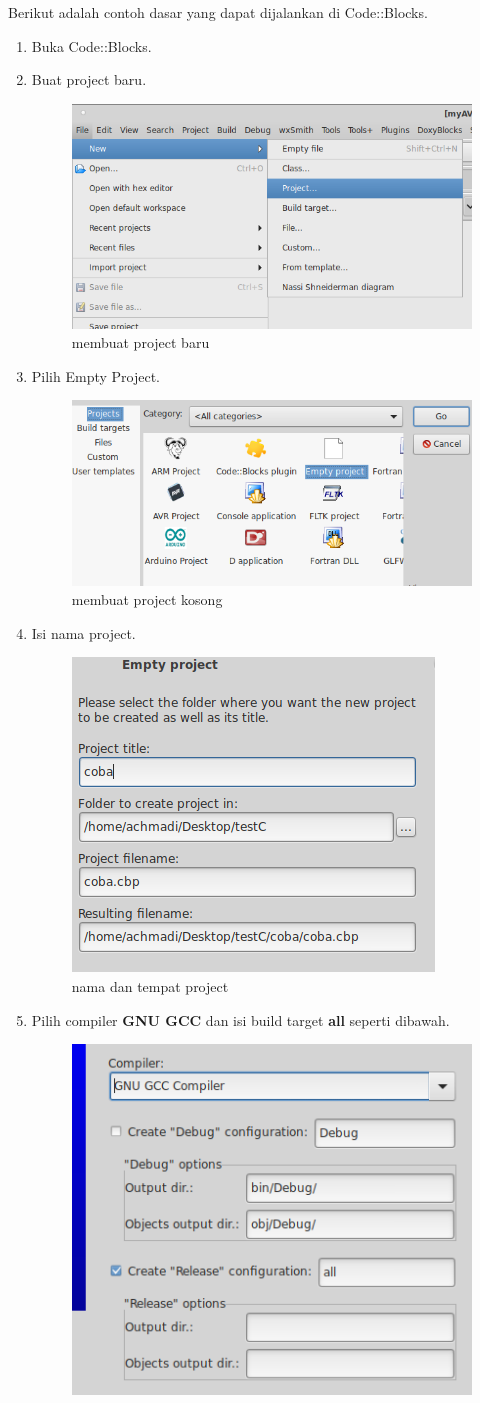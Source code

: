 \documentclass[12pt,]{article}
\begin{document}
	Berikut adalah contoh dasar yang dapat dijalankan di Code::Blocks.
	\begin{enumerate}
		\item Buka Code::Blocks.
		\item Buat project baru.
		\begin{figure}[H]
			\centering
			\includegraphics[width=0.5\linewidth]{images/c_cb_0}
			\caption{membuat project baru}
		\end{figure}
		\item Pilih Empty Project.
		\begin{figure}[H]
			\centering
			\includegraphics[width=0.4\linewidth]{images/c_cb_1}
			\caption{membuat project kosong}
		\end{figure}
		\item Isi nama project.
		\begin{figure}[H]
			\centering
			\includegraphics[width=0.4\linewidth]{images/c_cb_2}
			\caption{nama dan tempat project}
		\end{figure}
		\item Pilih compiler \textbf{GNU GCC} dan isi build target \textbf{all} seperti dibawah.
		\begin{figure}[H]
			\centering
			\includegraphics[width=0.4\linewidth]{images/c_cb_3}

\end{figure}
\end{enumerate}
\end{document}

